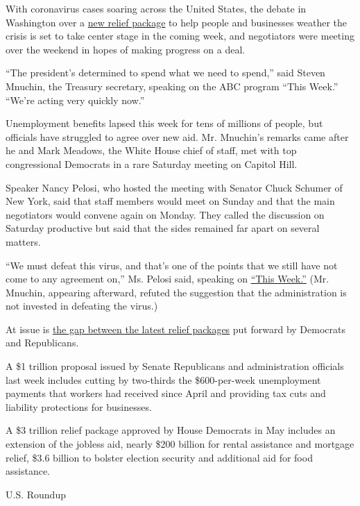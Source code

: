 With coronavirus cases soaring across the United States, the debate in
Washington over a
\href{https://www.nytimes3xbfgragh.onion/2020/07/28/us/politics/coronavirus-relief-bills-house-senate.html}{new
relief package} to help people and businesses weather the crisis is set
to take center stage in the coming week, and negotiators were meeting
over the weekend in hopes of making progress on a deal.

``The president's determined to spend what we need to spend,'' said
Steven Mnuchin, the Treasury secretary, speaking on the ABC program
``This Week.'' ``We're acting very quickly now.''

Unemployment benefits lapsed this week for tens of millions of people,
but officials have struggled to agree over new aid. Mr. Mnuchin's
remarks came after he and Mark Meadows, the White House chief of staff,
met with top congressional Democrats in a rare Saturday meeting on
Capitol Hill.

Speaker Nancy Pelosi, who hosted the meeting with Senator Chuck Schumer
of New York, said that staff members would meet on Sunday and that the
main negotiators would convene again on Monday. They called the
discussion on Saturday productive but said that the sides remained far
apart on several matters.

``We must defeat this virus, and that's one of the points that we still
have not come to any agreement on,'' Ms. Pelosi said, speaking on
\href{https://abcnews.go.com/ThisWeek/video/speaker-house-nancy-pelosi-72130729}{``This
Week.''} (Mr. Mnuchin, appearing afterward, refuted the suggestion that
the administration is not invested in defeating the virus.)

At issue is
\href{https://www.nytimes3xbfgragh.onion/2020/07/28/us/politics/coronavirus-relief-bills-house-senate.html}{the
gap between the latest relief packages} put forward by Democrats and
Republicans.

A \$1 trillion proposal issued by Senate Republicans and administration
officials last week includes cutting by two-thirds the \$600-per-week
unemployment payments that workers had received since April and
providing tax cuts and liability protections for businesses.

A \$3 trillion relief package approved by House Democrats in May
includes an extension of the jobless aid, nearly \$200 billion for
rental assistance and mortgage relief, \$3.6 billion to bolster election
security and additional aid for food assistance.

U.S. Roundup

